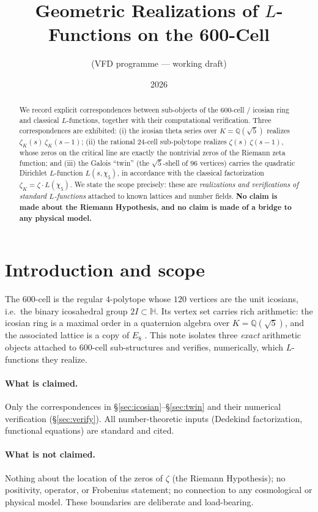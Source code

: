 \documentclass[11pt]{article}
\title{Geometric Realizations of $L$-Functions on the 600-Cell}
\author{(VFD programme --- working draft)}
\date{2026}
\theoremstyle{definition}
\newcommand{\Q}{\mathbb{Q}}
\newcommand{\zetaK}{\zeta_{K}}
\begin{document}
\maketitle

\begin{abstract}
We record explicit correspondences between sub-objects of the $600$-cell / icosian
ring and classical $L$-functions, together with their computational verification.
Three correspondences are exhibited: (i) the icosian theta series over
$K=\Q(\sqrt5)$ realizes $\zetaK(s)\,\zetaK(s-1)$; (ii) the rational $24$-cell
sub-polytope realizes $\zeta(s)\,\zeta(s-1)$, whose zeros on the critical line are
exactly the nontrivial zeros of the Riemann zeta function; and (iii) the
Galois ``twin'' (the $\sqrt5$-shell of $96$ vertices) carries the quadratic
Dirichlet $L$-function $L(s,\chi_5)$, in accordance with the classical
factorization $\zetaK=\zeta\cdot L(\chi_5)$. We state the scope precisely: these are
\emph{realizations and verifications of standard $L$-functions} attached to known
lattices and number fields. \textbf{No claim is made about the Riemann Hypothesis,
and no claim is made of a bridge to any physical model.}
\end{abstract}

\section{Introduction and scope}
The $600$-cell is the regular $4$-polytope whose $120$ vertices are the unit
icosians, i.e.\ the binary icosahedral group $2I\subset\mathbb{H}$. Its vertex set
carries rich arithmetic: the icosian ring is a maximal order in a quaternion algebra
over $K=\Q(\sqrt5)$, and the associated lattice is a copy of $E_8$
\cite{ConwaySloane}. This note isolates three \emph{exact} arithmetic objects
attached to $600$-cell sub-structures and verifies, numerically, which $L$-functions
they realize.

\paragraph{What is claimed.} Only the correspondences in
\S\ref{sec:icosian}--\S\ref{sec:twin} and their numerical verification
(\S\ref{sec:verify}). All number-theoretic inputs (Dedekind factorization,
functional equations) are standard and cited.

\paragraph{What is not claimed.} Nothing about the location of the zeros of
$\zeta$ (the Riemann Hypothesis); no positivity, operator, or Frobenius statement;
no connection to any cosmological or physical model. These boundaries are
deliberate and load-bearing.
\end{document}
